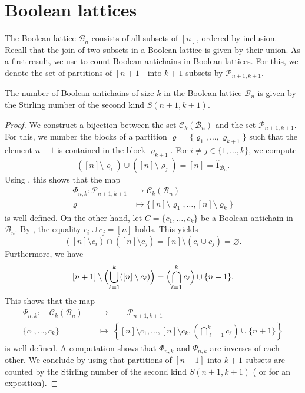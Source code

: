 \documentclass{preprint}
\newcommand{\cB}{\mathcal{B}}
\newcommand{\cC}{\mathcal{C}}
\newcommand{\cP}{\mathcal{P}}
\theoremstyle{definition}
\begin{document}
\section{Boolean lattices}\label{sec: Boolean lattices}
The Boolean lattice $\cB_n$ consists of all subsets of $[n]$, ordered by inclusion. Recall that the join of two subsets in a Boolean lattice is given by their union. As a first result, we use  to count Boolean antichains in Boolean lattices. 
For this, we denote the set of partitions of $[n+1]$ into $k+1$ subsets by $\cP_{n+1,k+1}$.

\begin{theorem}\label{thm:main_thm_for_Boolean_lattices}
    The number of Boolean antichains of size $k$ in the Boolean lattice $\cB_n$ is given by the Stirling number of the second kind $S(n+1,k+1)$.
\end{theorem}
\begin{proof}
    We construct a bijection between the set $\cC_k(\cB_n)$ and the set $\cP_{n+1,k+1}$. For this, we number the blocks of a partition $\varrho = \{\varrho_1, \dots, \varrho_{k+1}\}$ such that the element $n+1$ is contained in the block $\varrho_{k+1}$. 
    For $i\neq j \in \{1, \dots, k\}$, we compute
    \[
    ([n]\setminus \varrho_i) \cup ([n] \setminus \varrho_j) = [n] = \hat{1}_{\cB_n}.
    \]
    Using , this shows that the map
    \begin{align*}
        \Phi_{n,k}: \cP_{n+1,k+1} &\rightarrow \cC_k(\cB_n) \\
        \varrho &\mapsto \{[n] \setminus \varrho_1, \dots, [n] \setminus \varrho_k \}
    \end{align*}
    is well-defined. On the other hand, let $C=\{c_1,\dots,c_k\}$ be a Boolean antichain in $\cB_n$. By , the equality $c_i \cup c_j = [n]$ holds. This yields
    \[
        ([n] \setminus c_i) \cap ([n] \setminus c_j) = [n] \setminus (c_i \cup c_j) = \varnothing.
    \]
    Furthermore, we have
    \[
        [n+1]\setminus \Bigl( \bigcup_{\ell=1}^{k} ([n] \setminus c_\ell)\Bigr) = \Bigl( \bigcap_{\ell=1}^k c_\ell\Bigr) \cup \{n+1\}.
    \]
    This shows that the map
    \begin{align*}
    \Psi_{n,k}:\quad \cC_k(\cB_n) \quad &\rightarrow \qquad \cP_{n+1,k+1} \\
    \{c_1, \dots, c_k\} \; &\mapsto \; \left\{ [n] \setminus c_1, \dots, [n] \setminus c_k, \left(\bigcap_{\ell=1}^{k} c_\ell\right) \cup \{n+1\}\right\}
    \end{align*}
    is well-defined. A computation shows that $\Phi_{n,k}$ and $\Psi_{n,k}$ are inverses of each other. We conclude by using that partitions of $[n+1]$ into $k+1$ subsets are counted by the Stirling number of the second kind $S(n+1,k+1)$ (\cite{stirling1749differential} or \cite[Section 6.1]{Stirling_numbers} for an exposition).
\end{proof}
\end{document}
